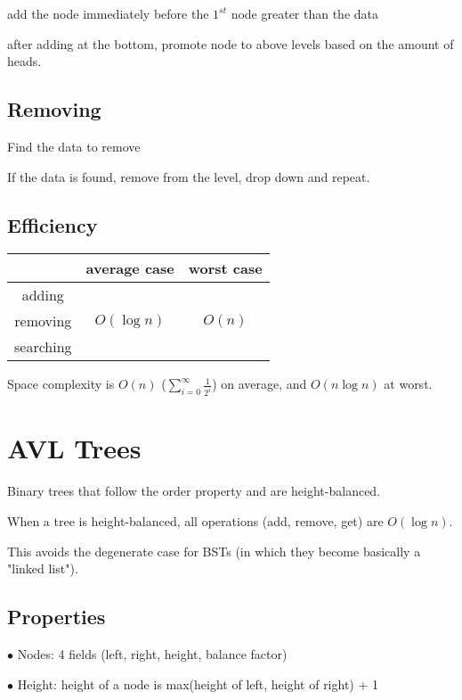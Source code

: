 \documentclass[english,openany]{book}
\begin{document}
    \quad\quad add the node immediately before the $1^{st}$ node greater than the data

    \quad\quad after adding at the bottom, promote node to above levels based on the amount of heads.\\

    \section{Removing}

    Find the data to remove

    If the data is found, remove from the level, drop down and repeat.\\

    \section{Efficiency}

    \begin{tabular}{c|c|c}
        &average case&worst case\\
        \hline
        adding&&\\
        removing&$O(\log n)$&$O(n)$\\
        searching&&\\
    \end{tabular}

    Space complexity is $O(n)$ ($\sum_{i=0}^{\infty} \frac{1}{2^i}$) on average, and $O(n \log n)$ at worst.


    \chapter{AVL Trees}

    Binary trees that follow the order property and are height-balanced.

    When a tree is height-balanced, all operations (add, remove, get) are $O(\log n)$.

    This avoids the degenerate case for BSTs (in which they become basically a "linked list").\\

    \section{Properties}

    $\bullet$ Nodes: 4 fields (left, right, height, balance factor)

    $\bullet$ Height: height of a node is  max(height of left, height of right) + 1
\end{document}
